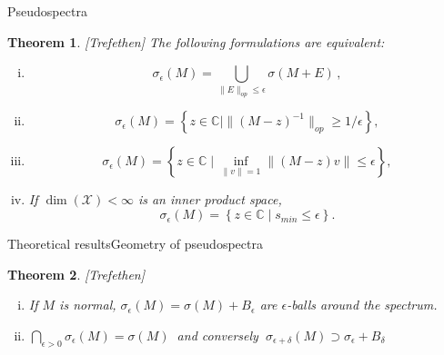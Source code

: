 \documentclass[
  english,            %
  aspectratio=169,    %
]{tumbeamer}
\newtheorem{theorem}{Theorem}
\newcommand{\bbC}{{\mathbb C}}
\newcommand{\cX}{\mathcal{X}}
\begin{document}
\begin{frame}{Pseudospectra}
  
\begin{theorem}

  [Trefethen] The following formulations are equivalent:
  \begin{enumerate}[(i)]
    \item \begin{equation}
      \sigma_\epsilon (M) = \bigcup_{\| E \|_{op} \leq \epsilon} \sigma (M + E) \,,
    \end{equation}
    \item \begin{equation}
      \sigma_\epsilon (M) = \left\{ z \in \bbC \mid \| (M - z)^{-1} \|_{op} \geq 1/\epsilon \right\} ,
    \end{equation}
    \item \begin{equation}
      \sigma_\epsilon (M) = \left\{ z \in \bbC \mid \inf_{\| v \| = 1} \| (M - z) v \| \leq \epsilon \right\} ,
    \end{equation}
    \item If $\dim (\cX) < \infty$ is an inner product space, \begin{equation}
      \sigma_\epsilon (M) = \left\{ z \in \bbC \mid s_{min} \leq \epsilon \right\} .
    \end{equation}
  \end{enumerate}
\end{theorem}

\end{frame}

\begin{frame}{Theoretical results}{Geometry of pseudospectra}
  
\begin{theorem} 
  
  [Trefethen]


  \begin{enumerate}[(i)]
    \item If $M$ is normal, $ \sigma_\epsilon (M) =  \sigma (M) + B_\epsilon $ are $\epsilon$-balls around the spectrum.  \vspace*{10ex}
    
    \item $ \bigcap_{\epsilon > 0} \sigma_\epsilon (M) = \sigma (M)\ $ and conversely $\ \sigma_{\epsilon + \delta} (M) \supset \sigma_\epsilon + B_\delta $
  \end{enumerate}
\end{theorem}

\end{frame}
\end{document}
